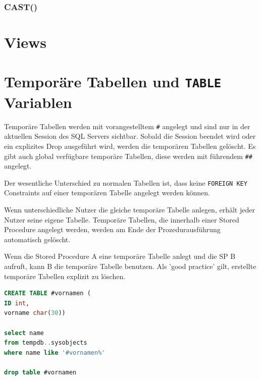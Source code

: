 \documentclass[12pt,ngerman,a4paper,index=totoc,twoside]{scrartcl}
\newcommand{\sql}[1]{\texttt{#1}}
\newcommand{\lwidth}{0.75}
\begin{document}
\subsubsection{CAST()}   

\section{Views}

\section{Temporäre Tabellen und \sql{TABLE} Variablen} 

Temporäre Tabellen werden mit vorangestelltem \sql{\#} angelegt und sind nur in der aktuellen Session des SQL Servers sichtbar. Sobald die Session beendet wird oder ein explizites Drop ausgeführt wird, werden die temporären Tabellen gelöscht. Es gibt auch global verfügbare temporäre Tabellen, diese werden mit führendem \sql{\#\#} angelegt.

Der wesentliche Unterschied zu normalen Tabellen ist, dass keine \sql{FOREIGN KEY}  Constraints auf einer temporären Tabelle angelegt werden können. 

Wenn unterschiedliche Nutzer die gleiche temporäre Tabelle anlegen, erhält jeder Nutzer seine eigene Tabelle. Temporäre Tabellen, die innerhalb einer Stored Procedure  angelegt werden, werden am Ende der Prozedurausführung automatisch gelöscht. 

Wenn die Stored Procedure A eine temporäre Tabelle anlegt und die SP B aufruft, kann B die temporäre Tabelle benutzen. Als 'good practice' gilt, erstellte temporäre Tabellen explizit zu löschen.  

\begin{center}
\begin{minipage}{\lwidth\textwidth}
\begin{lstlisting}[language={SQL},caption={Nutzung einer temporären Tabelle},label={temptabellen:tabellen1}]
CREATE TABLE #vornamen (
ID int,
vorname char(30))

select name
from tempdb..sysobjects 
where name like '#vornamen%'

drop table #vornamen
\end{lstlisting}
\end{minipage}
\end{center} 
\end{document}
